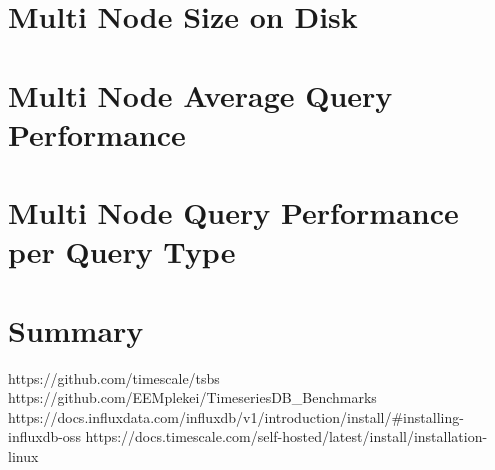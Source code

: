 \documentclass[conference]{IEEEtran}
\begin{document}
\section{Multi Node Size on Disk}



\section{Multi Node Average Query Performance}



\section{Multi Node Query Performance per Query Type}



\section{Summary}


\begin{thebibliography}{00}
 https://github.com/timescale/tsbs
 https://github.com/EEMplekei/TimeseriesDB\_Benchmarks
 https://docs.influxdata.com/influxdb/v1/introduction/install/\#installing-influxdb-oss
 https://docs.timescale.com/self-hosted/latest/install/installation-linux
\end{thebibliography}
\end{document}
